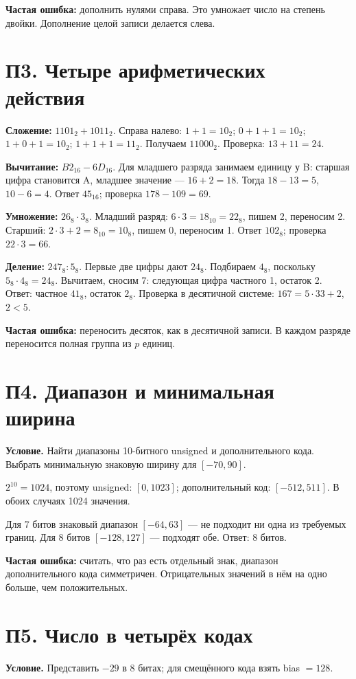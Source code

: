 \textbf{Частая ошибка:} дополнить нулями справа. Это умножает число на степень двойки. Дополнение целой записи делается слева.

\section{П3. Четыре арифметических действия}\label{ex:p3}
\textbf{Сложение:} $1101_2+1011_2$. Справа налево:
$1+1=10_2$; $0+1+1=10_2$; $1+0+1=10_2$; $1+1+1=11_2$.
Получаем $11000_2$. Проверка: $13+11=24$.

\textbf{Вычитание:} $B2_{16}-6D_{16}$. Для младшего разряда занимаем единицу у B: старшая цифра становится A, младшее значение --- $16+2=18$. Тогда $18-13=5$, $10-6=4$. Ответ $45_{16}$; проверка $178-109=69$.

\textbf{Умножение:} $26_8\cdot3_8$. Младший разряд: $6\cdot3=18_{10}=22_8$, пишем 2, переносим 2. Старший: $2\cdot3+2=8_{10}=10_8$, пишем 0, переносим 1. Ответ $102_8$; проверка $22\cdot3=66$.

\textbf{Деление:} $247_8:5_8$. Первые две цифры дают $24_8$. Подбираем $4_8$, поскольку $5_8\cdot4_8=24_8$. Вычитаем, сносим 7: следующая цифра частного 1, остаток 2. Ответ: частное $41_8$, остаток $2_8$.
Проверка в десятичной системе: $167=5\cdot33+2$, $2<5$.

\textbf{Частая ошибка:} переносить десяток, как в десятичной записи. В каждом разряде переносится полная группа из $p$ единиц.

\section{П4. Диапазон и минимальная ширина}\label{ex:p4}
\textbf{Условие.} Найти диапазоны 10-битного unsigned и дополнительного кода. Выбрать минимальную знаковую ширину для $[-70,90]$.

$2^{10}=1024$, поэтому unsigned: $[0,1023]$; дополнительный код: $[-512,511]$. В обоих случаях 1024 значения.

Для 7 битов знаковый диапазон $[-64,63]$ --- не подходит ни одна из требуемых границ. Для 8 битов $[-128,127]$ --- подходят обе. Ответ: 8 битов.

\textbf{Частая ошибка:} считать, что раз есть отдельный знак, диапазон дополнительного кода симметричен. Отрицательных значений в нём на одно больше, чем положительных.

\section{П5. Число в четырёх кодах}\label{ex:p5}
\textbf{Условие.} Представить $-29$ в 8 битах; для смещённого кода взять bias $=128$.

